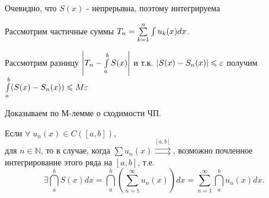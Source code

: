 \begin{plan}
\item Очевидно, что $S(x)$ - непрерывна, поэтому интегрируема
\item Рассмотрим частичные суммы $T_n = \sum\limits_{k=1}^{n}\int u_k(x)dx$.
\item Рассмотрим разницу $\left\lvert T_n - \int\limits_a^bS(x) \right\rvert$ и т.к. $\left\lvert S(x) - S_n(x) \right\rvert \leqslant \varepsilon$ получим $\int\limits_a^b (S(x) - S_n(x)) \leqslant M \varepsilon$
\item Доказываем по М-лемме о сходимости ЧП.
\end{plan}
\begin{theorem}
	Если $\forall \; u_n(x) \in C([a,b]), $ \\ для $n \in \mathbb{N}$, то в случае, когда $\sum u_n(x) \overset{[a,b]}{\rightrightarrows}$, возможно почленное интегрирование этого ряда на $[a,b]$, т.е.
	\begin{equation}
	\label{eq:lecture01-32}
	\exists \dint\limits_a^b S(x)dx = \dint\limits_a^b \left(\sum_{n=1}^{\infty}u_n(x)\right)dx = \sum_{n=1}^{\infty} \dint\limits_a^b u_n(x)dx.
	\end{equation}
\end{theorem}
